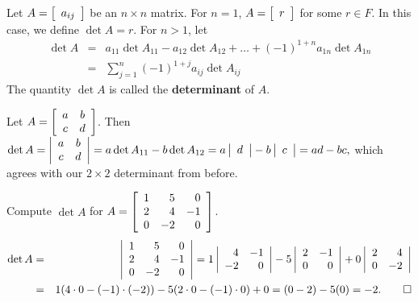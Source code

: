 \begin{Def} Let $A = \mtx{c}{a_{ij}}$ be an $n\times n$ matrix. For $n=1$, $A = \mtx{c}{r}$ for some $r\in F$. In this case, we define $\det A = r$. For $n > 1$, let 
\begin{eqnarray*}
\det A &=& a_{11}\det A_{11} - a_{12}\det A_{12} + \ldots + (-1)^{1+n}a_{1n}\det A_{1n}\\
&=& \sum_{j=1}^n (-1)^{1+j}a_{ij}\det A_{ij}
\end{eqnarray*} The quantity $\det A$ is called the \textbf{determinant} of $A$.
\end{Def}\vs

Let $A = \mtx{cc}{a&b\\c&d}$. Then $\det A = \dtx{cc}{a&b\\c&d} = a \det A_{11} - b \det A_{12} = a\dtx{c}{d} - b\dtx{c}{c} = ad-bc,$ which agrees with our $2\times 2$ determinant from before.\\

%

\begin{Exam} Compute $\det A$ for $A = \mtx{rrr}{1&5&0\\2&4&-1\\0&-2&0}$.\\

\begin{eqnarray*}
\det A &=& \dtx{rrr}{1&5&0\\2&4&-1\\0&-2&0} = 1\dtx{rr}{4&-1\\-2&0} - 5\dtx{rr}{2&-1\\0&0} + 0\dtx{rr}{2&4\\0&-2}\\
&=& 1(4\cdot 0 - (-1)\cdot(-2)) -5(2\cdot 0 - (-1)\cdot 0) + 0 = (0-2) - 5(0) = -2. \qedhere
\end{eqnarray*}
\end{Exam}\vs


